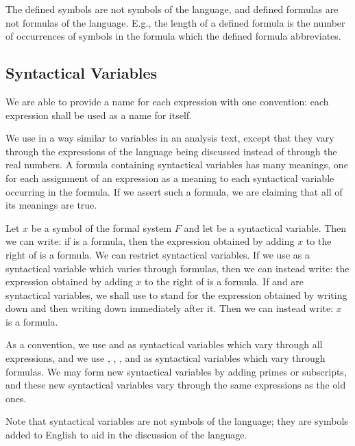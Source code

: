 \begin{remark}
The defined symbols are not symbols of the language, and defined formulas are not formulas of the language. E.g., the length of a defined formula is the number of occurrences of symbols in the formula which the defined formula abbreviates.
\end{remark}


\subsection{Syntactical Variables}

We are able to provide a name for each expression with one convention: each expression shall be used as a name for itself.

We use  in a way similar to variables in an analysis text, except that they vary through the expressions of the language being discussed instead of through the real numbers.
A formula containing syntactical variables has many meanings, one for each assignment of an expression as a meaning to each syntactical variable occurring in the formula.
If we assert such a formula, we are claiming that all of its meanings are true.

\begin{example}
Let $x$ be a symbol of the formal system $F$ and let \bu{} be a syntactical variable.
Then we can write: if \bu{} is a formula, then the expression obtained by adding $x$ to the right of \bu{} is a formula.
We can restrict syntactical variables.
If we use \A{} as a syntactical variable which varies through formulas, then we can instead write: the expression obtained by adding $x$ to the right of \A{} is a formula.
If \bu{} and \bv{} are syntactical variables, we shall use \bu{}\bv{} to stand for the expression obtained by writing down \bu{} and then writing down \bv{} immediately after it.
Then we can instead write: \A{}$x$ is a formula.
\end{example}

As a convention, we use \bu{} and \bv{} as syntactical variables which vary through all expressions, and we use \A{}, \B{}, \C{}, and \D{} as syntactical variables which vary through formulas.
We may form new syntactical variables by adding primes or subscripts, and these new syntactical variables vary through the same expressions as the old ones.

Note that syntactical variables are not symbols of the language; they are symbols added to English to aid in the discussion of the language.
